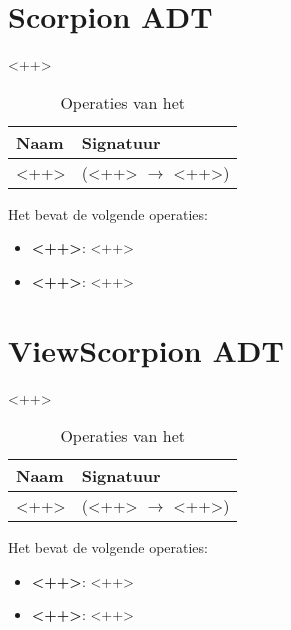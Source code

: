 \section{Scorpion ADT}
\label{section:scorpion}

<++>

\begin{table}[hbt]
\centering
\begin{tabular}{|ll|}
\hline
\rowcolor[HTML]{000000} 
{\color[HTML]{FFFFFF} \textbf{Naam}} & {\color[HTML]{FFFFFF} \textbf{Signatuur}} \\ \hline
<++>                                 & (<++> $\rightarrow$ <++>)                                       \\ \hline
\end{tabular}
\caption{Operaties van het \texttt{}}
\label{table:scorpion}
\end{table}

Het \texttt{} bevat de volgende operaties:

\begin{itemize}
	\item \textbf{<++>}: <++>
	\item \textbf{<++>}: <++>
\end{itemize}

\section{View\textunderscore Scorpion ADT}
\label{section:view_scorpion}

<++>

\begin{table}[hbt]
\centering
\begin{tabular}{|ll|}
\hline
\rowcolor[HTML]{000000} 
{\color[HTML]{FFFFFF} \textbf{Naam}} & {\color[HTML]{FFFFFF} \textbf{Signatuur}} \\ \hline
<++>                                 & (<++> $\rightarrow$ <++>)                                       \\ \hline
\end{tabular}
\caption{Operaties van het \texttt{}}
\label{table:view_scorpion}
\end{table}

Het \texttt{} bevat de volgende operaties:

\begin{itemize}
	\item \textbf{<++>}: <++>
	\item \textbf{<++>}: <++>
\end{itemize}


